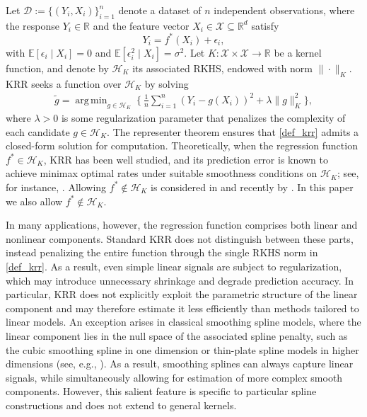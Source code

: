 \documentclass[11pt,twoside]{article}
\DeclareMathOperator*{\argmin}{arg\,min}
\def\RR{\mathbb{R}}
\def\EE{\mathbb{E}}
\def\cH{\mathcal H}
\def\cD{\mathcal D}
\def\cX{\mathcal{X}}
\def\wt{\widetilde}
\def\B{\Big}
\begin{document}
Let $\cD := \{(Y_i, X_i)\}_{i=1}^n$ denote a dataset of $n$ independent observations, where the response $Y_i \in \RR$ and the feature vector $X_i \in \cX \subseteq \RR^d$  satisfy
\begin{equation}\label{model}
   Y_i=f^*(X_i)+\epsilon_i,
\end{equation}
with $\EE[\epsilon_i \mid X_i] = 0$ and $\EE[\epsilon_i^2 \mid X_i] = \sigma^2$. Let $K : \cX \times \cX \to \RR$ be a kernel function, and denote by $\cH_K$ its associated RKHS, endowed with norm $\|\cdot\|_K$.  KRR seeks a function over $\cH_K$ by solving  
\begin{align}\label{def_krr}
\wt  g   = \argmin _{g \in \cH_K}  ~ \B\{~   \frac{1}{n} \sum_{i=1}^n \left( Y_i - g (X_i) \right)^2 + \lambda  \|g\|_K^2 \B\}, 
\end{align}
where $\lambda>0$ is some regularization parameter that penalizes the complexity of each candidate $g\in \cH_K$. The representer theorem \citep{kimeldorf1971some} ensures that \eqref{def_krr} admits a closed-form solution for computation.  Theoretically, when the regression function $f^*\in \cH_K$, KRR has been well studied, and its prediction error is known to achieve minimax optimal rates under suitable smoothness conditions on $\cH_K$; see, for instance,  \cite{bartlett2005local,caponnetto2007optimal,smale2007learning}. Allowing $f^* \notin \cH_K$ is considered in \cite{steinwart2009optimal,steinwart2008support} and recently by \cite{fischer2020sobolev,bing2025kernel}. In this paper we also allow $f^*\notin \cH_K$.


In many applications, however, the regression function comprises both linear and nonlinear components. Standard KRR does not distinguish between these parts, instead penalizing the entire function through the single RKHS norm in \eqref{def_krr}. As a result, even simple linear signals are subject to regularization, which may introduce unnecessary shrinkage and degrade prediction accuracy. In particular, KRR does not explicitly exploit the parametric structure of the linear component and may therefore estimate it less efficiently than methods tailored to linear models.  An exception arises in classical smoothing spline models, where the linear component lies in the null space of the associated spline penalty, such as the cubic smoothing spline in one dimension or thin-plate spline models in higher dimensions (see, e.g., \cite{Wahba1990,GreenSilverman1994,Wood2017}). As a result, smoothing splines can always capture linear signals, while simultaneously allowing for estimation of more complex smooth components. However, this salient feature is specific to particular spline constructions and does not extend to general kernels.
\end{document}

